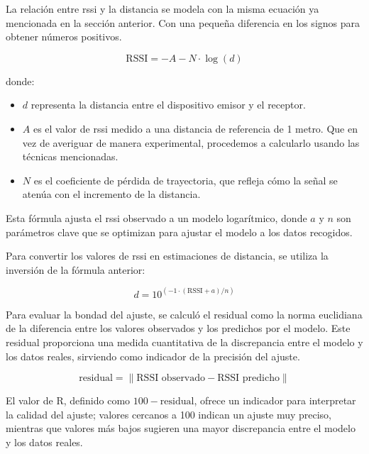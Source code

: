 La relación entre \acs{rssi} y la distancia se modela con la misma ecuación ya mencionada en la sección anterior. Con una pequeña diferencia en los signos para obtener números positivos.

\begin{equation}
    \text{RSSI} = -A - N \cdot \log(d)
\end{equation}

donde:

\begin{itemize}
    \item \(d\) representa la distancia entre el dispositivo emisor y el receptor.
    \item \(A\) es el valor de \acs{rssi} medido a una distancia de referencia de 1 metro. Que en vez de averiguar de manera experimental, procedemos a calcularlo usando las técnicas mencionadas.
    \item \(N\) es el coeficiente de pérdida de trayectoria, que refleja cómo la señal se atenúa con el incremento de la distancia.
\end{itemize}

Esta fórmula ajusta el \acs{rssi} observado a un modelo logarítmico, donde \(a\) y \(n\) son parámetros clave que se optimizan para ajustar el modelo a los datos recogidos.

Para convertir los valores de \acs{rssi} en estimaciones de distancia, se utiliza la inversión de la fórmula anterior:

\begin{equation}
    d = 10^{(-1 \cdot (\text{RSSI} + a) / n)}
\end{equation}

Para evaluar la bondad del ajuste, se calculó el residual como la norma euclidiana de la diferencia entre los valores observados y los predichos por el modelo. Este residual proporciona una medida cuantitativa de la discrepancia entre el modelo y los datos reales, sirviendo como indicador de la precisión del ajuste.

\begin{equation}
    \text{residual} = \lVert \text{RSSI observado} - \text{RSSI predicho} \rVert
\end{equation}

El valor de R, definido como $100 - \text{residual}$, ofrece un indicador para interpretar la calidad del ajuste; valores cercanos a 100 indican un ajuste muy preciso, mientras que valores más bajos sugieren una mayor discrepancia entre el modelo y los datos reales.

